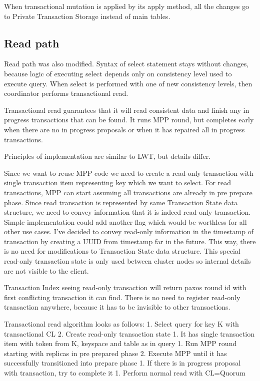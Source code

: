 When transactional mutation is applied by its apply method, all the changes go to Private Transaction Storage instead of main tables.


\subsection{Read path}
Read path was also modified. Syntax of select statement stays without changes, because logic of executing select depends only on consistency level used to execute query.  When select is performed with one of new consistency levels, then coordinator performs transactional read.


Transactional read guarantees that it will read consistent data and finish any in progress transactions that can be found. It runs MPP round, but completes early when there are no in progress proposals or when it has repaired all in progress transactions.


Principles of implementation are similar to LWT, but details differ.


Since we want to reuse MPP code we need to create a read-only transaction with single transaction item representing key which we want to select. For read transactions, MPP can start assuming all transactions are already in pre prepare phase. Since read transaction is represented by same Transaction State data structure, we need to convey information that it is indeed read-only transaction. Simple implementation could add another flag which would be worthless for all other use cases. I’ve decided to convey read-only information in the timestamp of transaction by creating a UUID from timestamp far in the future. This way, there is no need for modifications to Transaction State data structure. This special read-only transaction state is only used between cluster nodes so internal details are not visible to the client.


Transaction Index seeing read-only transaction will return paxos round id with first conflicting transaction it can find. There is no need to register read-only transaction anywhere, because it has to be invisible to other transactions.


Transactional read algorithm looks as follows:
1. Select query for key K with transactional CL
2. Create read-only transaction state
   1. It has single transaction item with token from K, keyspace and table as in query
1. Run MPP round starting with replicas in pre prepared phase
2. Execute MPP until it has successfully transitioned into prepare phase
   1. If there is in progress proposal with transaction, try to complete it
1. Perform normal read with CL=Quorum


